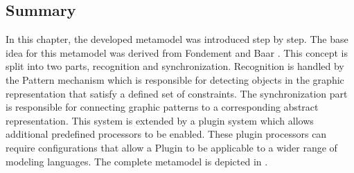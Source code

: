 \subsection{Summary}
In this chapter, the developed metamodel was introduced step by step. The base idea for this metamodel was derived from Fondement and Baar \cite{fondement_making_2005}. This concept is split into two parts, recognition and synchronization. Recognition is handled by the Pattern mechanism which is responsible for detecting objects in the graphic representation that satisfy a defined set of constraints. The synchronization part is responsible for connecting graphic patterns to a corresponding abstract representation. This system is extended by a plugin system which allows additional predefined processors to be enabled. These plugin processors can require configurations that allow a Plugin to be applicable to a wider range of modeling languages. The complete metamodel is depicted in .